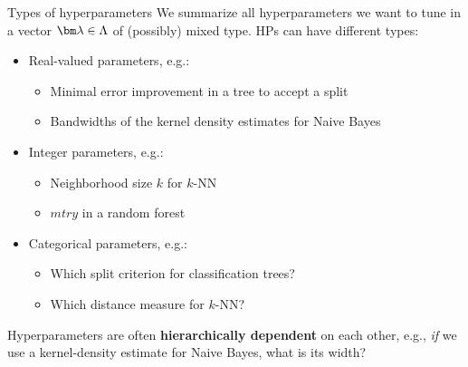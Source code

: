 \documentclass[11pt,compress,t,notes=noshow, xcolor=table]{beamer}
\begin{document}
\begin{vbframe}{Types of hyperparameters}
We summarize all hyperparameters we want to tune in a vector $\lamv \in \Lam$ of (possibly) mixed type. HPs can have different types: 

\begin{itemize}
\item Real-valued parameters, e.g.:
\begin{itemize}
\item Minimal error improvement in a tree to accept a split
\item Bandwidths of the kernel density estimates for Naive Bayes 
\end{itemize}
\item Integer parameters, e.g.:
\begin{itemize}
\item Neighborhood size $k$ for $k$-NN
\item $mtry$ in a random forest
\end{itemize}
\item Categorical parameters, e.g.:
\begin{itemize}
\item Which split criterion for classification trees?
\item Which distance measure for $k$-NN?
\end{itemize}
\end{itemize}

Hyperparameters are often \textbf{hierarchically dependent} on each other, e.g., \emph{if} we use 
a kernel-density estimate for Naive Bayes, what is its width? 
\end{vbframe}


\endlecture
\end{document}
